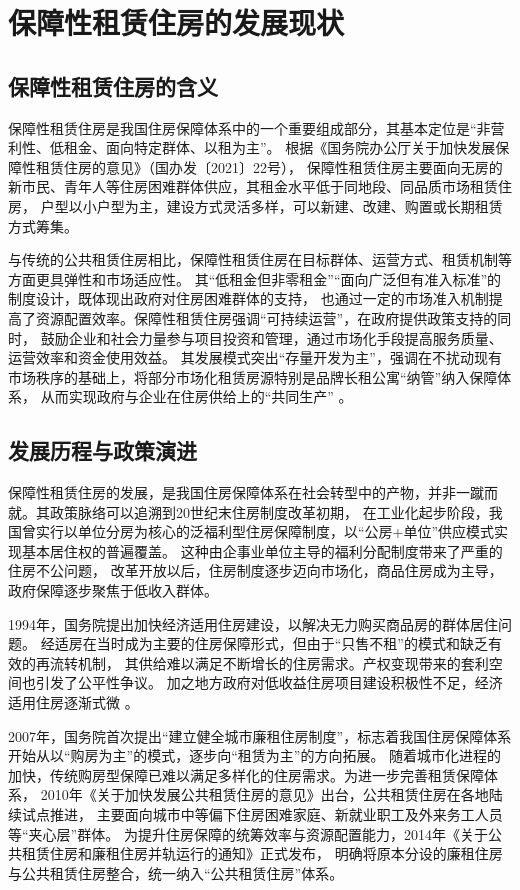 \section{保障性租赁住房的发展现状}
\subsection{保障性租赁住房的含义}
保障性租赁住房是我国住房保障体系中的一个重要组成部分，其基本定位是“非营利性、低租金、面向特定群体、以租为主”。
根据《国务院办公厅关于加快发展保障性租赁住房的意见》（国办发〔2021〕22号），
保障性租赁住房主要面向无房的新市民、青年人等住房困难群体供应，其租金水平低于同地段、同品质市场租赁住房，
户型以小户型为主，建设方式灵活多样，可以新建、改建、购置或长期租赁方式筹集。

与传统的公共租赁住房相比，保障性租赁住房在目标群体、运营方式、租赁机制等方面更具弹性和市场适应性。
其“低租金但非零租金”“面向广泛但有准入标准”的制度设计，既体现出政府对住房困难群体的支持，
也通过一定的市场准入机制提高了资源配置效率。保障性租赁住房强调“可持续运营”，在政府提供政策支持的同时，
鼓励企业和社会力量参与项目投资和管理，通过市场化手段提高服务质量、运营效率和资金使用效益。
其发展模式突出“存量开发为主”，强调在不扰动现有市场秩序的基础上，将部分市场化租赁房源特别是品牌长租公寓“纳管”纳入保障体系，
从而实现政府与企业在住房供给上的“共同生产” \cite{RN5}。

\subsection{发展历程与政策演进}
保障性租赁住房的发展，是我国住房保障体系在社会转型中的产物，并非一蹴而就。其政策脉络可以追溯到20世纪末住房制度改革初期，
在工业化起步阶段，我国曾实行以单位分房为核心的泛福利型住房保障制度，以“公房+单位”供应模式实现基本居住权的普遍覆盖。
这种由企事业单位主导的福利分配制度带来了严重的住房不公问题，
改革开放以后，住房制度逐步迈向市场化，商品住房成为主导，政府保障逐步聚焦于低收入群体。

1994年，国务院提出加快经济适用住房建设，以解决无力购买商品房的群体居住问题。
经适房在当时成为主要的住房保障形式，但由于“只售不租”的模式和缺乏有效的再流转机制，
其供给难以满足不断增长的住房需求。产权变现带来的套利空间也引发了公平性争议。
加之地方政府对低收益住房项目建设积极性不足，经济适用住房逐渐式微 \cite{RN6}。

2007年，国务院首次提出“建立健全城市廉租住房制度”，标志着我国住房保障体系开始从以“购房为主”的模式，逐步向“租赁为主”的方向拓展。
随着城市化进程的加快，传统购房型保障已难以满足多样化的住房需求。为进一步完善租赁保障体系，
2010年《关于加快发展公共租赁住房的意见》出台，公共租赁住房在各地陆续试点推进，
主要面向城市中等偏下住房困难家庭、新就业职工及外来务工人员等“夹心层”群体。
为提升住房保障的统筹效率与资源配置能力，2014年《关于公共租赁住房和廉租住房并轨运行的通知》正式发布，
明确将原本分设的廉租住房与公共租赁住房整合，统一纳入“公共租赁住房”体系。


